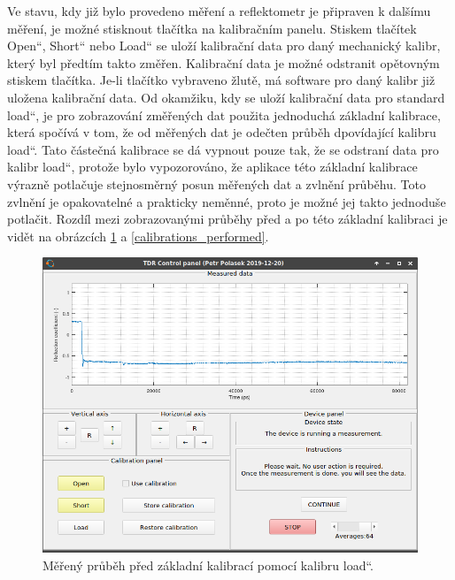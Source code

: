 Ve stavu, kdy již bylo provedeno měření a reflektometr je připraven k dalšímu měření, je možné stisknout tlačítka na kalibračním panelu. Stiskem tlačítek \quotedblbase Open\textquotedblleft, \quotedblbase Short\textquotedblleft{} nebo \quotedblbase Load\textquotedblleft{} se uloží kalibrační data pro daný mechanický kalibr, který byl předtím takto změřen. Kalibrační data je možné odstranit opětovným stiskem tlačítka. Je-li tlačítko vybraveno žlutě, má software pro daný kalibr již uložena kalibrační data. Od okamžiku, kdy se uloží kalibrační data pro standard \quotedblbase load\textquotedblleft , je pro zobrazování změřených dat použita jednoduchá základní kalibrace, která spočívá v tom, že od měřených dat je odečten průběh dpovídající kalibru \quotedblbase load\textquotedblleft . Tato částečná kalibrace se dá vypnout pouze tak, že se odstraní data pro kalibr \quotedblbase load\textquotedblleft , protože bylo vypozorováno, že aplikace této základní kalibrace výrazně potlačuje stejnosměrný posun měřených dat a zvlnění průběhu. Toto zvlnění je opakovatelné a prakticky neměnné, proto je možné jej takto jednoduše potlačit. Rozdíl mezi zobrazovanými průběhy před a po této základní kalibraci je vidět na obrázcích \ref{calibration_running} a \ref{calibrations_performed}.

\begin{figure}[htbp]
\includegraphics[width=\textwidth,keepaspectratio]{images/gui/calibration_running.png}\caption{Měřený průběh před základní kalibrací pomocí kalibru \quotedblbase load\textquotedblleft .}\label{calibration_running}
\end{figure}


